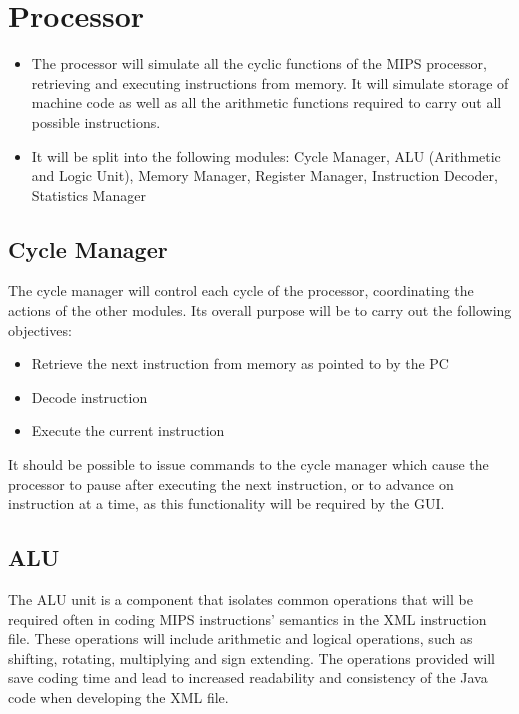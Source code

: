 \documentclass[12pt]{report}
\begin{document}
\section{Processor}

\begin{itemize}

\item The processor will simulate all the cyclic functions of the MIPS processor, retrieving and executing instructions from memory. It will simulate storage of machine code as well as all the arithmetic functions required to carry out all possible instructions.

\item It will be split into the following modules: Cycle Manager, ALU (Arithmetic and Logic Unit), Memory Manager, Register Manager, Instruction Decoder, Statistics Manager

\end{itemize}


\subsection{Cycle Manager}

The cycle manager will control each cycle of the processor, coordinating the actions of the other modules. Its overall purpose will be to carry out the following objectives:

\begin{itemize}
\item	Retrieve the next instruction from memory as pointed to by the PC
\item Decode instruction
\item Execute the current instruction
\end{itemize}

It should be possible to issue commands to the cycle manager which cause the processor to pause after executing the next instruction, or to advance on instruction at a time, as this functionality will be required by the GUI.


\subsection{ALU}

The ALU unit is a component that isolates common operations that will be required often in coding MIPS instructions' semantics in the XML instruction file. These operations will include arithmetic and logical operations, such as shifting, rotating, multiplying and sign extending. The operations provided will save coding time and lead to increased readability and consistency of the Java code when developing the XML file.
\end{document}
